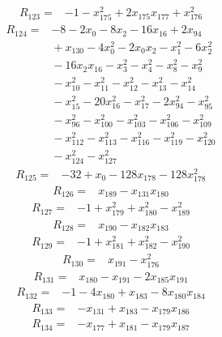 \documentclass[11pt]{article}
\theoremstyle{definition}
\theoremstyle{remark}
\begin{document}
\begin{align*}
R_{123} ={}& -1 - x_{175}^{2} + 2x_{175} x_{177} + x_{176}^{2}
\end{align*}
\begin{align*}
R_{124} ={}& -8 - 2x_{0} - 8x_{2} - 16x_{16} + 2x_{94} \\
&{} + x_{130} - 4x_{0}^{2} - 2x_{0} x_{2} - x_{1}^{2} - 6x_{2}^{2} \\
&{} -16x_{2} x_{16} - x_{3}^{2} - x_{4}^{2} - x_{8}^{2} - x_{9}^{2} \\
&{} -x_{10}^{2} - x_{11}^{2} - x_{12}^{2} - x_{13}^{2} - x_{14}^{2} \\
&{} -x_{15}^{2} - 20x_{16}^{2} - x_{17}^{2} - 2x_{94}^{2} - x_{95}^{2} \\
&{} -x_{96}^{2} - x_{100}^{2} - x_{103}^{2} - x_{106}^{2} - x_{109}^{2} \\
&{} -x_{112}^{2} - x_{113}^{2} - x_{116}^{2} - x_{119}^{2} - x_{120}^{2} \\
&{} -x_{124}^{2} - x_{127}^{2}
\end{align*}
\begin{align*}
R_{125} ={}& -32 + x_{0} - 128x_{178} - 128x_{178}^{2}
\end{align*}
\begin{align*}
R_{126} ={}& x_{189} - x_{131} x_{180}
\end{align*}
\begin{align*}
R_{127} ={}& -1 + x_{179}^{2} + x_{180}^{2} - x_{189}^{2}
\end{align*}
\begin{align*}
R_{128} ={}& x_{190} - x_{182} x_{183}
\end{align*}
\begin{align*}
R_{129} ={}& -1 + x_{181}^{2} + x_{182}^{2} - x_{190}^{2}
\end{align*}
\begin{align*}
R_{130} ={}& x_{191} - x_{176}^{2}
\end{align*}
\begin{align*}
R_{131} ={}& x_{180} - x_{191} - 2x_{185} x_{191}
\end{align*}
\begin{align*}
R_{132} ={}& -1 - 4x_{180} + x_{183} - 8x_{180} x_{184}
\end{align*}
\begin{align*}
R_{133} ={}& -x_{131} + x_{183} - x_{179} x_{186}
\end{align*}
\begin{align*}
R_{134} ={}& -x_{177} + x_{181} - x_{179} x_{187}
\end{align*}
\end{document}
